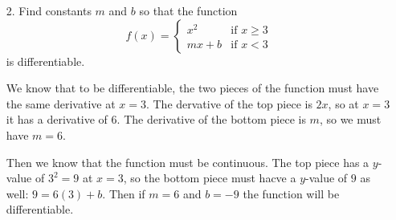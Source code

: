 \documentclass[11pt]{article}
\begin{document}
\newsavebox{\quizback}
\begin{lrbox}{\quizback}
\begin{minipage}[top][4.5in][t]{\textwidth} \setlength{\parindent}{1.5em}
\begin{enumerate}
\item[2.] Find constants $m$ and $b$ so that the function
  \[
  f(x) = \begin{cases} x^2 &\mbox{if } x\geq 3\\
    mx+b &\mbox{if } x < 3 \end{cases}
  \]
  is differentiable.

  \vfill
  {\color{blue}
    
    We know that to be differentiable, the two pieces of the function
    must have the same derivative at $x=3$. The dervative of the top
    piece is $2x$, so at $x=3$ it has a derivative of $6$. The
    derivative of the bottom piece is $m$, so we must have $m = 6$.

    Then we know that the function must be continuous.  The top piece
    has a $y$-value of $3^2 = 9$ at $x = 3$, so the bottom piece must
    hacve a $y$-value of $9$ as well: $9 = 6(3) + b$.  Then if $m = 6$
    and $b = -9$ the function will be differentiable.
    
  }
  \vfill
\end{enumerate}
\end{minipage}
\end{lrbox}

\noindent \usebox{\quizfront}
\vfill
\noindent \usebox{\quizback}

\end{document}
